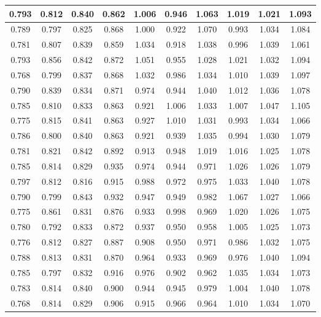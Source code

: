 \begin{table}[!ht]
\begin{tabular}{|c|c|c|c|c|c|c|c|c|c|}
      0.793 & 0.812 & 0.840 & 0.862 & 1.006 & 0.946 & 1.063 & 1.019 & 1.021 & 1.093 \\ \hline
      0.789 & 0.797 & 0.825 & 0.868 & 1.000 & 0.922 & 1.070 & 0.993 & 1.034 & 1.084 \\ \hline
      0.781 & 0.807 & 0.839 & 0.859 & 1.034 & 0.918 & 1.038 & 0.996 & 1.039 & 1.061 \\ \hline
      0.793 & 0.856 & 0.842 & 0.872 & 1.051 & 0.955 & 1.028 & 1.021 & 1.032 & 1.094 \\ \hline
      0.768 & 0.799 & 0.837 & 0.868 & 1.032 & 0.986 & 1.034 & 1.010 & 1.039 & 1.097 \\ \hline
      0.790 & 0.839 & 0.834 & 0.871 & 0.974 & 0.944 & 1.040 & 1.012 & 1.036 & 1.078 \\ \hline
      0.785 & 0.810 & 0.833 & 0.863 & 0.921 & 1.006 & 1.033 & 1.007 & 1.047 & 1.105 \\ \hline
      0.775 & 0.815 & 0.841 & 0.863 & 0.927 & 1.010 & 1.031 & 0.993 & 1.034 & 1.066 \\ \hline
      0.786 & 0.800 & 0.840 & 0.863 & 0.921 & 0.939 & 1.035 & 0.994 & 1.030 & 1.079 \\ \hline
      0.781 & 0.821 & 0.842 & 0.892 & 0.913 & 0.948 & 1.019 & 1.016 & 1.025 & 1.078 \\ \hline
      0.785 & 0.814 & 0.829 & 0.935 & 0.974 & 0.944 & 0.971 & 1.026 & 1.026 & 1.079 \\ \hline
      0.797 & 0.812 & 0.816 & 0.915 & 0.988 & 0.972 & 0.975 & 1.033 & 1.040 & 1.078 \\ \hline
      0.790 & 0.799 & 0.843 & 0.932 & 0.947 & 0.949 & 0.982 & 1.067 & 1.027 & 1.066 \\ \hline
      0.775 & 0.861 & 0.831 & 0.876 & 0.933 & 0.998 & 0.969 & 1.020 & 1.026 & 1.075 \\ \hline
      0.780 & 0.792 & 0.833 & 0.872 & 0.937 & 0.950 & 0.958 & 1.005 & 1.025 & 1.073 \\ \hline
      0.776 & 0.812 & 0.827 & 0.887 & 0.908 & 0.950 & 0.971 & 0.986 & 1.032 & 1.075 \\ \hline
      0.788 & 0.813 & 0.831 & 0.870 & 0.964 & 0.933 & 0.969 & 0.976 & 1.040 & 1.094 \\ \hline
      0.785 & 0.797 & 0.832 & 0.916 & 0.976 & 0.902 & 0.962 & 1.035 & 1.034 & 1.073 \\ \hline
      0.783 & 0.814 & 0.840 & 0.900 & 0.944 & 0.945 & 0.979 & 1.004 & 1.040 & 1.078 \\ \hline
      0.768 & 0.814 & 0.829 & 0.906 & 0.915 & 0.966 & 0.964 & 1.010 & 1.034 & 1.070 \\ \hline

\end{tabular}
\end{table}
